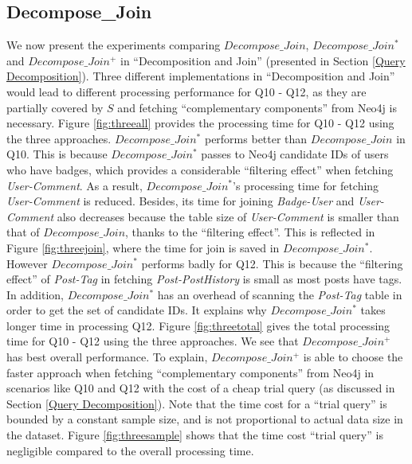 \subsection{Decompose\_Join}
\label{exp:DecomposeJoin}
We now present the experiments comparing  $Decompose\_Join$, $Decompose\_Join^{*}$ and $Decompose\_Join^{+}$ in ``Decomposition and Join'' (presented in Section \ref{Query Decomposition}). Three different implementations in ``Decomposition and Join'' would lead to different processing performance for Q10 - Q12, as they are partially covered by $S$ and fetching ``complementary components'' from Neo4j is necessary. Figure \ref{fig:threeall} provides the processing time for Q10 - Q12 using the three approaches. $Decompose\_Join^{*}$ performs  better than $Decompose\_Join$ in Q10. This is because $Decompose\_Join^{*}$ passes to Neo4j candidate IDs of users who have badges, which provides a considerable ``filtering effect'' when fetching \textit{User-Comment}. As a result, $Decompose\_Join^{*}$'s processing time for fetching \textit{User-Comment} is reduced. Besides, its time for joining \textit{Badge-User} and \textit{User-Comment} also decreases because the table size of \textit{User-Comment} is smaller than that of $Decompose\_Join$, thanks to the ``filtering effect''. This is reflected in Figure \ref{fig:threejoin}, where the time for join is saved in $Decompose\_Join^{*}$. However $Decompose\_Join^{*}$ performs badly for Q12. This is because the ``filtering effect'' of \textit{Post-Tag} in fetching \textit{Post-PostHistory} is small as most posts have tags. In addition, $Decompose\_Join^{*}$ has an overhead of scanning the \textit{Post-Tag} table in order to get the set of candidate IDs. It explains why $Decompose\_Join^{*}$ takes longer time in processing Q12. Figure \ref{fig:threetotal} gives the total processing time for Q10 - Q12 using the three approaches. We see that $Decompose\_Join^{+}$ has best overall performance. To explain,  $Decompose\_Join^{+}$ is able to choose the faster approach when fetching ``complementary components'' from Neo4j in scenarios like Q10 and Q12 with  the cost of a cheap trial query (as discussed in Section \ref{Query Decomposition}). Note that the time cost for a ``trial query'' is bounded by a constant sample size, and is not proportional to actual data size in the dataset. Figure \ref{fig:threesample} shows that the time cost ``trial query'' is negligible compared to the overall processing time.


